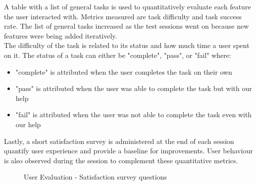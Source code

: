 \noindent A table with a list of general tasks is used to quantitatively evaluate each feature the user interacted with. Metrics measured are task difficulty and task success rate. The list of general tasks increased as the test sessions went on because new features were being added iteratively.\\
The difficulty of the task is related to its status and how much time a user spent on it. The status of a task can either be "complete", "pass", or "fail" where:
\begin{itemize}
    \item "complete" is attributed when the user completes the task on their own
    \item "pass" is attributed when the user was able to complete the task but with our help
    \item "fail" is attributed when the user was not able to complete the task even with our help
\end{itemize}
Lastly, a short satisfaction survey is administered at the end of each session quantify user experience and provide a baseline for improvements. User behaviour is also observed during the session to complement these quantitative metrics.\\
\begin{figure}
    \centering
    \caption{User Evaluation - Satisfaction survey questions}
\end{figure}

\newpage
